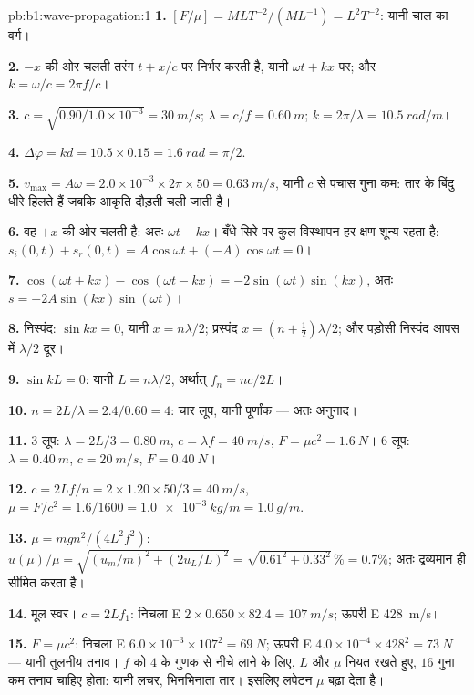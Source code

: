 \begin{solution}{pb:b1:wave-propagation:1}
\textbf{1.} $[F/\mu] = M L T^{-2}/(M L^{-1}) = L^2 T^{-2}$: यानी चाल का
वर्ग।

\textbf{2.} $-x$ की ओर चलती तरंग $t + x/c$ पर निर्भर करती है, यानी
$\omega t + kx$ पर; और $k = \omega/c = 2\pi f/c$।

\textbf{3.} $c = \sqrt{0.90/1.0\times10^{-3}} = \qty{30}{m/s}$;
$\lambda = c/f = \qty{0.60}{m}$; $k = 2\pi/\lambda = \qty{10.5}{rad/m}$।

\textbf{4.} $\Delta\varphi = kd = 10.5 \times 0.15 = \qty{1.6}{rad} = \pi/2$.

\textbf{5.} $v_{\max} = A\omega = 2.0\times10^{-3} \times 2\pi \times 50 =
\qty{0.63}{m/s}$, यानी $c$ से पचास गुना कम: तार के बिंदु धीरे हिलते हैं जबकि
आकृति दौड़ती चली जाती है।

\textbf{6.} वह $+x$ की ओर चलती है: अतः  $\omega t - kx$। बँधे
सिरे पर कुल विस्थापन हर क्षण शून्य रहता है: $s_i(0, t) + s_r(0, t)
= A\cos\omega t + (-A)\cos\omega t = 0$।

\textbf{7.} $\cos(\omega t + kx) - \cos(\omega t - kx) =
-2\sin(\omega t)\sin(kx)$, अतः $s = -2A\sin(kx)\sin(\omega t)$।

\textbf{8.} निस्पंद: $\sin kx = 0$, यानी $x = n\lambda/2$; प्रस्पंद $x = (n +
\tfrac12)\lambda/2$; और पड़ोसी निस्पंद आपस में $\lambda/2$ दूर।

\textbf{9.} $\sin kL = 0$: यानी $L = n\lambda/2$, अर्थात् $f_n = nc/2L$।

\textbf{10.} $n = 2L/\lambda = 2.4/0.60 = 4$: चार लूप, यानी पूर्णांक
--- अतः अनुनाद।

\textbf{11.} $3$ लूप: $\lambda = 2L/3 = \qty{0.80}{m}$, $c = \lambda f
= \qty{40}{m/s}$, $F = \mu c^2 = \qty{1.6}{N}$। $6$ लूप: $\lambda =
\qty{0.40}{m}$, $c = \qty{20}{m/s}$, $F = \qty{0.40}{N}$।

\textbf{12.} $c = 2Lf/n = 2 \times 1.20 \times 50/3 = \qty{40}{m/s}$,
$\mu = F/c^2 = 1.6/1600 = \qty{1.0e-3}{kg/m} = \qty{1.0}{g/m}$.

\textbf{13.} $\mu = mgn^2/(4L^2f^2)$: $u(\mu)/\mu = \sqrt{(u_m/m)^2 +
(2u_L/L)^2} = \sqrt{0.61^2 + 0.33^2}\,\% = 0.7\%$; अतः द्रव्यमान ही सीमित करता है।

\textbf{14.} मूल स्वर। $c = 2Lf_1$: निचला E $2 \times 0.650 \times
82.4 = \qty{107}{m/s}$; ऊपरी E \qty{428}{m/s}।

\textbf{15.} $F = \mu c^2$: निचला E $6.0\times10^{-3} \times 107^2 =
\qty{69}{N}$; ऊपरी E $4.0\times10^{-4} \times 428^2 = \qty{73}{N}$ ---
यानी तुलनीय तनाव। $f$ को $4$ के गुणक से नीचे लाने के लिए, $L$ और $\mu$ नियत
रखते हुए, $16$ गुना कम तनाव चाहिए होता: यानी लचर, भिनभिनाता तार। इसलिए
लपेटन $\mu$ बढ़ा देता है।


\end{solution}
